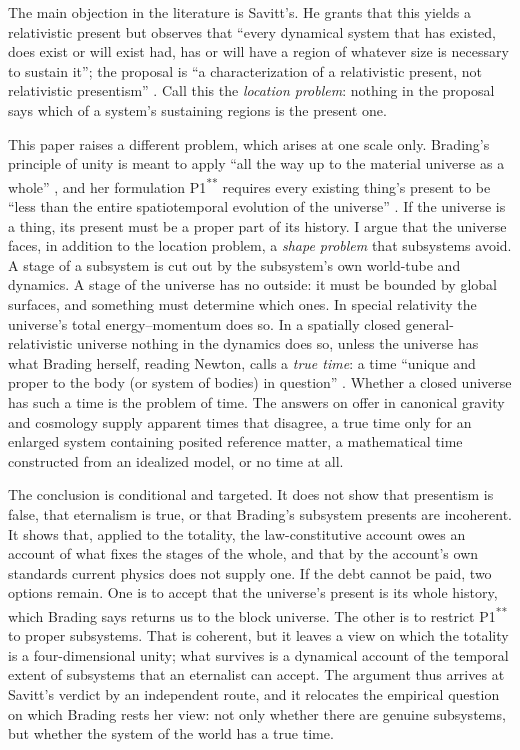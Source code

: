 \documentclass[11pt]{article}
\begin{document}
The main objection in the literature is Savitt's. He grants that this yields
a relativistic present but observes that ``every dynamical system that has
existed, does exist or will exist had, has or will have a region of whatever
size is necessary to sustain it''; the proposal is ``a characterization of a
relativistic present, not relativistic presentism''
\citep[sec.~3.3]{Savitt2021}. Call this the \emph{location problem}: nothing in
the proposal says which of a system's sustaining regions is the present one.

This paper raises a different problem, which arises at one scale only.
Brading's principle of unity is meant to apply ``all the way up to the
material universe as a whole'' \citep[p.~16]{Brading2015}, and her
formulation P1\textsuperscript{**} requires every existing thing's present to
be ``less than the entire spatiotemporal evolution of the universe''
\citep[p.~17]{Brading2015}. If the universe is a thing, its present must be a
proper part of its history. I argue that the universe faces, in addition to
the location problem, a \emph{shape problem} that subsystems avoid. A stage of
a subsystem is cut out by the subsystem's own world-tube and dynamics. A stage
of the universe has no outside: it must be bounded by global surfaces, and
something must determine which ones. In special relativity the universe's
total energy--momentum does so. In a spatially closed general-relativistic
universe nothing in the dynamics does so, unless the universe has what
Brading herself, reading Newton, calls a \emph{true time}: a time ``unique
and proper to the body (or system of bodies) in question''
\citep[p.~20]{Brading2017}. Whether a closed universe has such a time is the
problem of time. The answers on offer in canonical gravity and cosmology
supply apparent times that disagree, a true time only for an enlarged system
containing posited reference matter, a mathematical time constructed from an
idealized model, or no time at all.

The conclusion is conditional and targeted. It does not show that presentism
is false, that eternalism is true, or that Brading's subsystem presents are
incoherent. It shows that, applied to the totality, the law-constitutive
account owes an account of what fixes the stages of the whole, and that by
the account's own standards current physics does not supply one. If the debt
cannot be paid, two options remain. One is to accept that the universe's
present is its whole history, which Brading says returns us to the block
universe. The other is to restrict P1\textsuperscript{**} to proper
subsystems. That is coherent, but it leaves a view on which the totality is a
four-dimensional unity; what survives is a dynamical account of the temporal
extent of subsystems that an eternalist can accept. The argument thus arrives
at Savitt's verdict by an independent route, and it relocates the empirical
question on which Brading rests her view: not only whether there are genuine
subsystems, but whether the system of the world has a true time.
\end{document}
